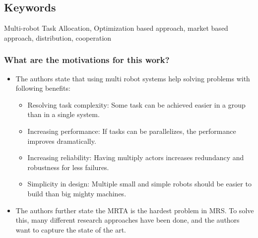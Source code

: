     \subsection*{Keywords}
    Multi-robot Task Allocation, Optimization based approach, market based approach, distribution, cooperation
    
     
    \subsubsection*{What are the motivations for this work?}
    \begin{itemize}
        \item The authors state that using multi robot systems help solving problems with following benefits: \ \begin{itemize}
            \item Resolving task complexity: Some task can be achieved easier in a group than in a single system.
            \item Increasing performance: If tasks can be parallelizes, the performance improves dramatically.
            \item Increasing reliability: Having multiply actors increases redundancy and robustness for less failures.
            \item Simplicity in design: Multiple small and simple robots should be easier to build than big mighty machines.
        \end{itemize}
        \item The authors further state the MRTA is the hardest problem in MRS. To solve this, many different research approaches have been done, and the authors want to capture the state of the art.
    \end{itemize}
    
